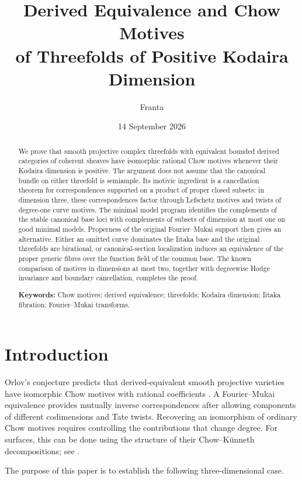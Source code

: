 \documentclass[11pt,a4paper]{article}
\title{Derived Equivalence and Chow Motives\\of Threefolds of Positive Kodaira Dimension}
\author{Franta}
\date{14 September 2026}
\begin{document}
\maketitle

\begin{abstract}

We prove that smooth projective complex threefolds with equivalent bounded derived categories of coherent sheaves have isomorphic rational Chow motives whenever their Kodaira dimension is positive. The argument does not assume that the canonical bundle on either threefold is semiample. Its motivic ingredient is a cancellation theorem for correspondences supported on a product of proper closed subsets: in dimension three, these correspondences factor through Lefschetz motives and twists of degree-one curve motives. The minimal model program identifies the complements of the stable canonical base loci with complements of subsets of dimension at most one on good minimal models. Properness of the original Fourier--Mukai support then gives an alternative. Either an omitted curve dominates the Iitaka base and the original threefolds are birational, or canonical-section localization induces an equivalence of the proper generic fibres over the function field of the common base. The known comparison of motives in dimensions at most two, together with degreewise Hodge invariance and boundary cancellation, completes the proof.

\noindent \textbf{Keywords:} Chow motives; derived equivalence; threefolds; Kodaira dimension; Iitaka fibration; Fourier--Mukai transforms.

\end{abstract}

\section{Introduction}

Orlov's conjecture predicts that derived-equivalent smooth projective varieties have isomorphic Chow motives with rational coefficients \cite{Orl05}. A Fourier--Mukai equivalence provides mutually inverse correspondences after allowing components of different codimensions and Tate twists. Recovering an isomorphism of ordinary Chow motives requires controlling the contributions that change degree. For surfaces, this can be done using the structure of their Chow--Künneth decompositions; see \cite[Theorem 1.1]{FV21}.

The purpose of this paper is to establish the following three-dimensional case.
\end{document}
